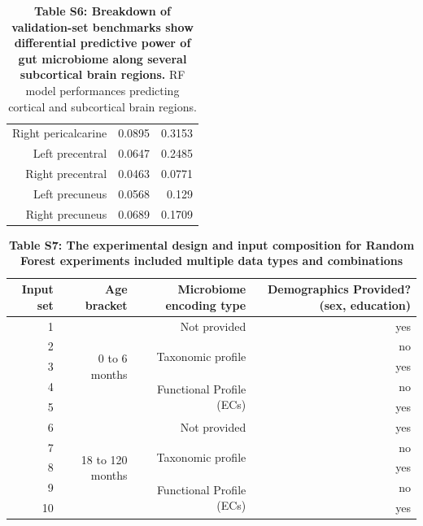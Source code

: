 \documentclass{article}
\begin{document}
\begin{table}[h]
\begin{centering}
\begin{tabular}{|r|r|r|}
    Right pericalcarine & 0.0895 & 0.3153 \\
    Left precentral & 0.0647 & 0.2485 \\
    Right precentral & 0.0463 & 0.0771 \\
    Left precuneus & 0.0568 & 0.129 \\
    Right precuneus & 0.0689 & 0.1709 \\\hline
  \end{tabular}
  \caption*{
      \textbf{Table S6: Breakdown of validation-set benchmarks show differential predictive power
      of gut microbiome along several subcortical brain regions.}
      RF model performances predicting cortical and
      subcortical brain regions.
  }
  \end{centering}
\end{table}


\begin{table}[h]
  \begin{centering}
    \begin{tabular}{|r|r|r|r|}
      \hline\hline
      \textbf{Input set} & \textbf{Age bracket} & \textbf{Microbiome encoding type} & \textbf{Demographics Provided? (sex, education)} \\\hline
      1 & \multirow{5}{*}{0 to 6 months} & Not provided & yes \\ \cline{3-4}
      2 &  & \multirow{2}{*}{Taxonomic profile} & no \\ \cline{4-4}
      3 &  &  & yes \\ \cline{3-4}
      4 &  & \multirow{2}{*}{Functional Profile (ECs)} & no \\ \cline{4-4}
      5 &  &  & yes \\ \cline{2-4}
      6 & \multirow{5}{*}{18 to 120 months} & Not provided & yes \\ \cline{3-4}
      7 &  & \multirow{2}{*}{Taxonomic profile} & no \\ \cline{4-4}
      8 &  &  & yes \\ \cline{3-4}
      9 &  & \multirow{2}{*}{Functional Profile (ECs)} & no \\ \cline{4-4}
      10 &  &  & yes \\\hline\hline
    \end{tabular}
    \caption*{
      \textbf{Table S7: The experimental design and input composition for Random
      Forest experiments included multiple data types and combinations}
      } 
  \end{centering}
\end{table}
\end{document}
